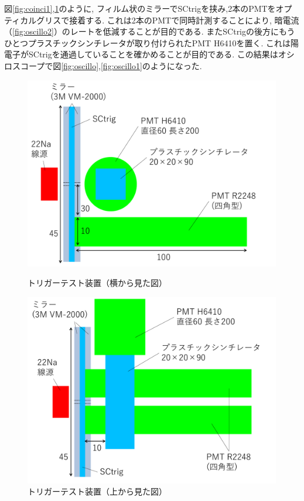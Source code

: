 図\ref{fig:coinci1},\ref{fig:coinci2}のように,
フィルム状のミラーでSCtrigを挟み,2本のPMTをオプティカルグリスで接着する.
これは2本のPMTで同時計測することにより,
暗電流（\ref{fig:oscillo2}）のレートを低減することが目的である.
またSCtrigの後方にもうひとつプラスチックシンチレータが取り付けられたPMT H6410を置く.
これは陽電子がSCtrigを通過していることを確かめることが目的である.
この結果はオシロスコープで図\ref{fig:oscillo},\ref{fig:oscillo1}のようになった.

\begin{figure}[H]
\begin{minipage}{0.5\hsize}
\centering
\includegraphics[keepaspectratio,scale=0.3]{fig/ybm/coinci1.pdf}
\caption{トリガーテスト装置（横から見た図）}
\label{fig:coinci1}
\end{minipage}
\begin{minipage}{0.5\hsize}
\centering
\includegraphics[keepaspectratio,scale=0.3]{fig/ybm/coinci2.pdf}
\caption{トリガーテスト装置（上から見た図）}
\label{fig:coinci2}
\end{minipage}
\end{figure}

